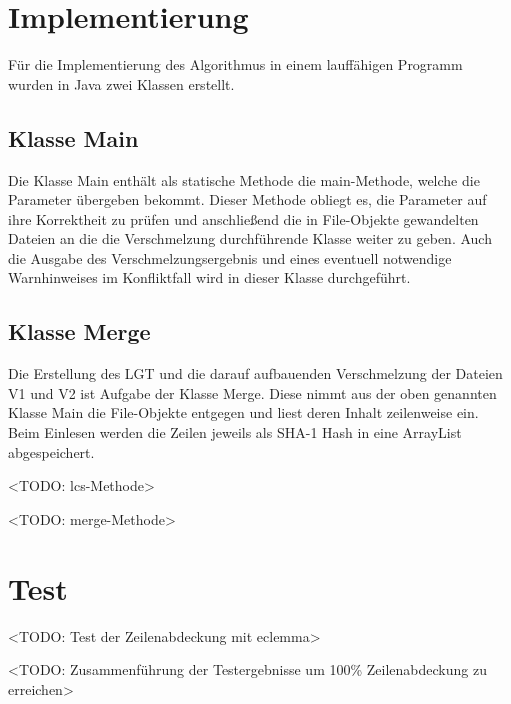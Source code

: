 \documentclass[a4paper,titlepage,12pt]{scrartcl}
\begin{document}
\section{Implementierung}
\label{sec:implementation}
Für die Implementierung des Algorithmus in einem lauffähigen Programm wurden in Java zwei Klassen erstellt.

\subsection{Klasse Main}
\label{sec:classmain}
Die Klasse Main enthält als statische Methode die main-Methode, welche die Parameter übergeben bekommt. Dieser Methode obliegt es, die Parameter auf ihre Korrektheit zu prüfen und anschließend die in File-Objekte gewandelten Dateien an die die Verschmelzung durchführende Klasse weiter zu geben. Auch die Ausgabe des Verschmelzungsergebnis und eines eventuell notwendige Warnhinweises im Konfliktfall wird in dieser Klasse durchgeführt.

\subsection{Klasse Merge}
\label{sec:classmerge}
Die Erstellung des LGT und die darauf aufbauenden Verschmelzung der Dateien V1 und V2 ist Aufgabe der Klasse Merge. Diese nimmt aus der oben genannten Klasse Main die File-Objekte entgegen und liest deren Inhalt zeilenweise ein. Beim Einlesen werden die Zeilen jeweils als SHA-1 Hash in eine ArrayList abgespeichert.

<TODO: lcs-Methode>

<TODO: merge-Methode>


\section{Test}
\label{sec:test}
<TODO: Test der Zeilenabdeckung mit eclemma>

<TODO: Zusammenführung der Testergebnisse um 100\% Zeilenabdeckung zu erreichen>


\clearpage
\appendix



\end{document}

